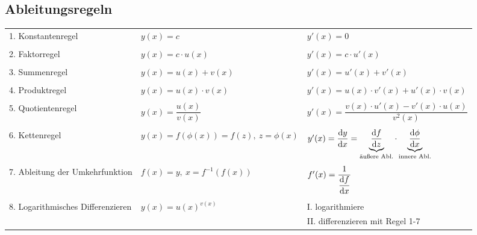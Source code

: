 \subsection{Ableitungsregeln}

\begin{tabular}{ l l l }
    1. Konstantenregel &
    \( y(x) = c \) &
    \( y'(x) = 0 \) \\
    \\
    2. Faktorregel &
    \( y(x) = c \cdot u(x) \) &
    \( y'(x) = c \cdot u'(x) \) \\
    \\
    3. Summenregel &
    \( y(x) = u(x) + v(x) \) &
    \( y'(x) = u'(x) + v'(x) \) \\
    \\
    4. Produktregel &
    \( y(x) = u(x) \cdot v(x) \) &
    \( y'(x) = u(x) \cdot v'(x) + u'(x) \cdot v(x) \) \\
    \\
    5. Quotientenregel &
    \( y(x) = \dfrac{u(x)}{v(x)} \) &
    \( y'(x) = \dfrac{v(x) \cdot u'(x) - v'(x) \cdot u(x)}{v^2(x)} \) \\
    \\
    6. Kettenregel &
    \( y(x) = f(\phi(x)) = f(z),\ z = \phi(x) \) &
    \( y'(x) = \dfrac{\mathop{}\!\mathrm{d} y}{\mathop{}\!\mathrm{d} x} = \underbrace{\dfrac{\mathop{}\!\mathrm{d} f}{\mathop{}\!\mathrm{d} z}}_{\text{äußere Abl.}} \cdot \underbrace{\dfrac{\mathop{}\!\mathrm{d} \phi}{\mathop{}\!\mathrm{d} x}}_{\text{innere Abl.}} \) \\
    \\
    7. Ableitung der Umkehrfunktion &
    \( f(x) = y,\ x = f^{-1}(f(x)) \) &
    \( f'(x) = \dfrac{1}{\dfrac{\mathop{}\!\mathrm{d} f}{\mathop{}\!\mathrm{d} x}} \) \\
    \\
    \multirow{2}{*}{8. Logarithmisches Differenzieren} &
    \multirow{2}{*}{\( y(x) = u(x)^{v(x)} \)} &
    I. logarithmiere \\
    & & II. differenzieren mit Regel 1-7 
\end{tabular}
  